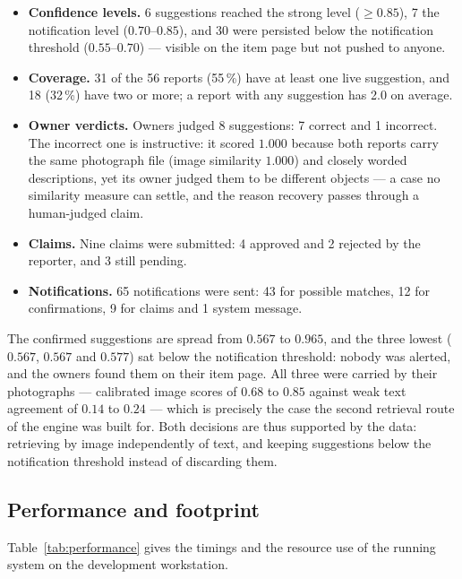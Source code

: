 \begin{itemize}[leftmargin=1.4em,itemsep=3pt]
  \item \textbf{Confidence levels.} 6 suggestions reached the strong level
        ($\geq 0.85$), 7 the notification level ($0.70$--$0.85$), and 30 were
        persisted below the notification threshold ($0.55$--$0.70$) --- visible
        on the item page but not pushed to anyone.
  \item \textbf{Coverage.} 31 of the 56 reports (55\,\%) have at least one live
        suggestion, and 18 (32\,\%) have two or more; a report with any
        suggestion has 2.0 on average.
  \item \textbf{Owner verdicts.} Owners judged 8 suggestions: 7 correct and 1
        incorrect. The incorrect one is instructive: it scored $1.000$ because
        both reports carry the same photograph file (image similarity $1.000$)
        and closely worded descriptions, yet its owner judged them to be
        different objects --- a case no similarity measure can settle, and the
        reason recovery passes through a human-judged claim.
  \item \textbf{Claims.} Nine claims were submitted: 4 approved and 2 rejected
        by the reporter, and 3 still pending.
  \item \textbf{Notifications.} 65 notifications were sent: 43 for possible
        matches, 12 for confirmations, 9 for claims and 1 system message.
\end{itemize}

The confirmed suggestions are spread from $0.567$ to $0.965$, and the three
lowest ($0.567$, $0.567$ and $0.577$) sat below the notification threshold:
nobody was alerted, and the owners found them on their item page. All three were
carried by their photographs --- calibrated image scores of $0.68$ to $0.85$
against weak text agreement of $0.14$ to $0.24$ --- which is precisely the case
the second retrieval route of the engine was built for. Both decisions are thus
supported by the data: retrieving by image independently of text, and keeping
suggestions below the notification threshold instead of discarding them.

\subsection{Performance and footprint}
\label{sec:eval-performance}

Table~\ref{tab:performance} gives the timings and the resource use of the
running system on the development workstation.

